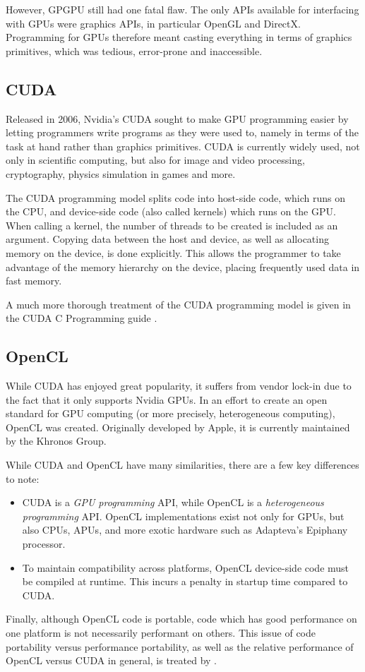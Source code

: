 However, GPGPU still had one fatal flaw. The only APIs available for interfacing with GPUs were graphics APIs, in particular OpenGL and DirectX. Programming for GPUs therefore meant casting everything in terms of graphics primitives, which was tedious, error-prone and inaccessible.

\subsection{CUDA}
Released in 2006, Nvidia's CUDA sought to make GPU programming easier by letting programmers write programs as they were used to, namely in terms of the task at hand rather than graphics primitives. CUDA is currently widely used, not only in scientific computing, but also for image and video processing, cryptography, physics simulation in games and more.

The CUDA programming model splits code into host-side code, which runs on the CPU, and device-side code (also called kernels) which runs on the GPU. When calling a kernel, the number of threads to be created is included as an argument. Copying data between the host and device, as well as allocating memory on the device, is done explicitly. This allows the programmer to take advantage of the memory hierarchy on the device, placing frequently used data in fast memory.

A much more thorough treatment of the CUDA programming model is given in the CUDA C Programming guide \citep{nvidia2014programming}.

\subsection{OpenCL}
While CUDA has enjoyed great popularity, it suffers from vendor lock-in due to the fact that it only supports Nvidia GPUs. In an effort to create an open standard for GPU computing (or more precisely, heterogeneous computing), OpenCL was created. Originally developed by Apple, it is currently maintained by the Khronos Group.

While CUDA and OpenCL have many similarities, there are a few key differences to note:
\begin{itemize}
\item CUDA is a \emph{GPU programming} API, while OpenCL is a \emph{heterogeneous programming} API. OpenCL implementations exist not only for GPUs, but also CPUs, APUs, and more exotic hardware such as Adapteva's Epiphany processor.
\item To maintain compatibility across platforms, OpenCL device-side code must be compiled at runtime. This incurs a penalty in startup time compared to CUDA.
\end{itemize}
Finally, although OpenCL code is portable, code which has good performance on one platform is not necessarily performant on others. This issue of code portability versus performance portability, as well as the relative performance of OpenCL versus CUDA in general, is treated by \citet{weber2011comparing}.

